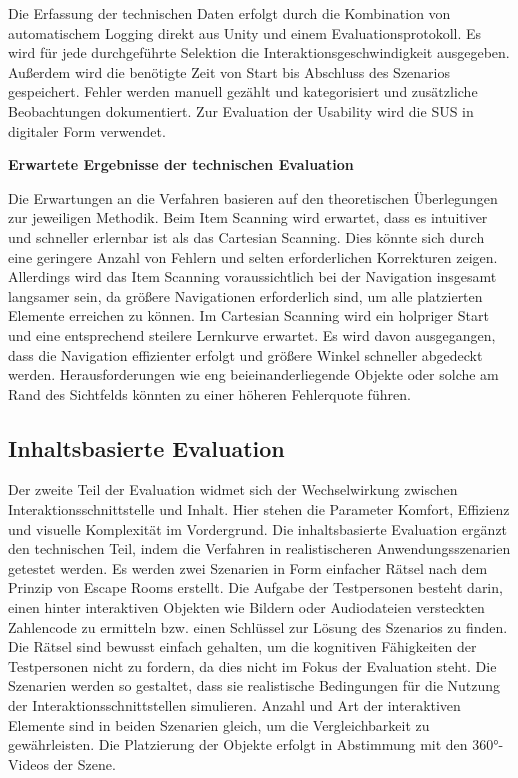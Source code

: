 Die Erfassung der technischen Daten erfolgt durch die Kombination von automatischem Logging direkt aus Unity und einem Evaluationsprotokoll. Es wird für jede durchgeführte Selektion die Interaktionsgeschwindigkeit ausgegeben. Außerdem wird die benötigte Zeit von Start bis Abschluss des Szenarios gespeichert. Fehler werden manuell gezählt und kategorisiert und zusätzliche Beobachtungen dokumentiert. Zur Evaluation der Usability wird die SUS in digitaler Form verwendet.

\textbf{Erwartete Ergebnisse der technischen Evaluation}

Die Erwartungen an die Verfahren basieren auf den theoretischen Überlegungen zur jeweiligen Methodik. Beim Item Scanning wird erwartet, dass es intuitiver und schneller erlernbar ist als das Cartesian Scanning. Dies könnte sich durch eine geringere Anzahl von Fehlern und selten erforderlichen Korrekturen zeigen. Allerdings wird das Item Scanning voraussichtlich bei der Navigation insgesamt langsamer sein, da größere Navigationen erforderlich sind, um alle platzierten Elemente erreichen zu können. Im Cartesian Scanning wird ein holpriger Start und eine entsprechend steilere Lernkurve erwartet. Es wird davon ausgegangen, dass die Navigation effizienter erfolgt und größere Winkel schneller abgedeckt werden. Herausforderungen wie eng beieinanderliegende Objekte oder solche am Rand des Sichtfelds könnten zu einer höheren Fehlerquote führen.

\subsection{Inhaltsbasierte Evaluation}

Der zweite Teil der Evaluation widmet sich der Wechselwirkung zwischen Interaktionsschnittstelle und Inhalt. Hier stehen die Parameter Komfort, Effizienz und visuelle Komplexität im Vordergrund. Die inhaltsbasierte Evaluation ergänzt den technischen Teil, indem die Verfahren in realistischeren Anwendungsszenarien getestet werden.
Es werden zwei Szenarien in Form einfacher Rätsel nach dem Prinzip von Escape Rooms erstellt. Die Aufgabe der Testpersonen besteht darin, einen hinter interaktiven Objekten wie Bildern oder Audiodateien versteckten Zahlencode zu ermitteln bzw. einen Schlüssel zur Lösung des Szenarios zu finden. Die Rätsel sind bewusst einfach gehalten, um die kognitiven Fähigkeiten der Testpersonen nicht zu fordern, da dies nicht im Fokus der Evaluation steht. Die Szenarien werden so gestaltet, dass sie realistische Bedingungen für die Nutzung der Interaktionsschnittstellen simulieren. Anzahl und Art der interaktiven Elemente sind in beiden Szenarien gleich, um die Vergleichbarkeit zu gewährleisten. Die Platzierung der Objekte erfolgt in Abstimmung mit den 360°-Videos der Szene. 

